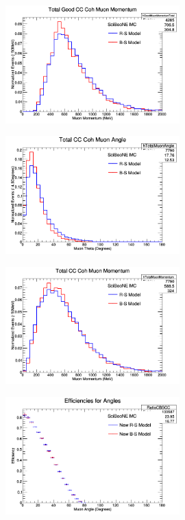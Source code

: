 \documentclass[11pt]{article}
\begin{document}
\begin{figure}[H]
\centering
\includegraphics[width=0.6\textwidth]{ANMCombinedPlotsImages/12-ANMCombinedPlots.png}
\caption{}
\end{figure}

\begin{figure}[H]
\centering
\includegraphics[width=0.6\textwidth]{ANMCombinedPlotsImages/13-ANMCombinedPlots.png}
\caption{}
\end{figure}

\begin{figure}[H]
\centering
\includegraphics[width=0.6\textwidth]{ANMCombinedPlotsImages/14-ANMCombinedPlots.png}
\caption{}
\end{figure}

\begin{figure}[H]
\centering
\includegraphics[width=0.6\textwidth]{ANMCombinedPlotsImages/15-ANMCombinedPlots.png}
\caption{}
\end{figure}
\end{document}

